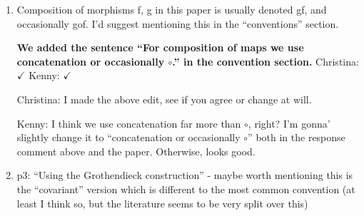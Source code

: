 \documentclass[reqno]{amsart}
\def\chris{\color{purple} Christina: }
\def\john{\color{red} John: }
\def\kenny{\color{blue} Kenny: }
\begin{document}
\begin{enumerate}
{\chris I agree. How does the above boldface sound?}

{\kenny Agreed about keeping the examples together. The boldface looks good to me.}

{\chris Fourth review starts here}
\item Composition of morphisms f, g in this paper is usually denoted gf, and occasionally gof. I’d suggest mentioning this in the “conventions” 
section.

{\bf We added the sentence ``For composition of maps we use concatenation or occasionally $\circ$.'' in the convention section.} {\chris $\checkmark$} {\kenny $\checkmark$}






{\chris I made the above edit, see if you agree or change at will.}

{\kenny I think we use concatenation far more than $\circ$, right? I'm gonna' slightly change it to ``concatenation or occasionally $\circ$'' both in the response comment above and the paper. Otherwise, looks good.}

\item p3: “Using the Grothendieck construction” - maybe worth mentioning this is the “covariant” version which is different to the most common 
convention 
(at least I think so, but the literature seems to be very split over this)


\end{enumerate}
\end{document}
